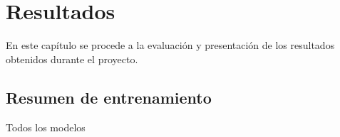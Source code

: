 \chapter{Resultados}\label{cap5}


En este capítulo se procede a la evaluación y presentación de los resultados obtenidos durante el proyecto.

\section{Resumen de entrenamiento}

Todos los modelos 